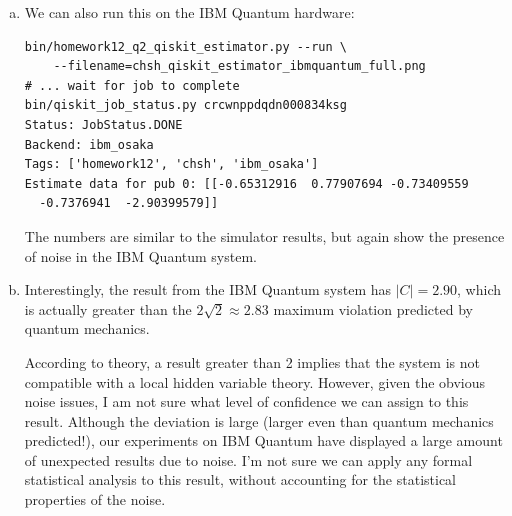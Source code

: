 \documentclass[12pt]{extarticle}
\begin{document}
\begin{enumerate}[(a)]
\item

We can also run this on the IBM Quantum hardware:

\begin{small}
\begin{verbatim}
bin/homework12_q2_qiskit_estimator.py --run \
    --filename=chsh_qiskit_estimator_ibmquantum_full.png
# ... wait for job to complete
bin/qiskit_job_status.py crcwnppdqdn000834ksg
Status: JobStatus.DONE
Backend: ibm_osaka
Tags: ['homework12', 'chsh', 'ibm_osaka']
Estimate data for pub 0: [[-0.65312916  0.77907694 -0.73409559
  -0.7376941  -2.90399579]]
\end{verbatim}
\end{small}

The numbers are similar to the simulator results, but again show the presence of noise in the IBM Quantum system.

\item

Interestingly, the result from the IBM Quantum system has $|C|=2.90$, which is actually greater than
the $2\sqrt{2}\approx 2.83$ maximum violation predicted by quantum mechanics.

According to theory, a result greater than 2 implies that the system is not compatible with a local hidden variable theory.
However, given the obvious noise issues, I am not sure what level of confidence we can assign to this result.
Although the deviation is large (larger even than quantum mechanics predicted!), our experiments on IBM Quantum
have displayed a large amount of unexpected results due to noise.
I'm not sure we can apply any formal statistical analysis to this result, without accounting for the statistical properties of the noise.

\end{enumerate}

\printbibliography
{}
\end{document}
